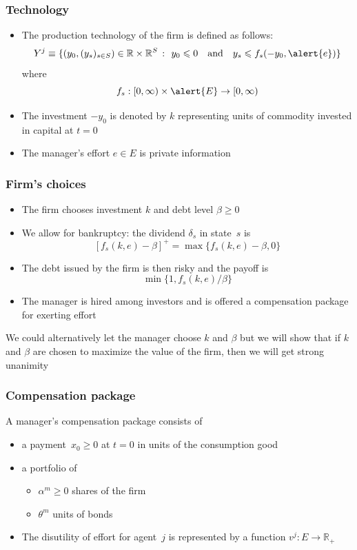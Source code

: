 \documentclass[blue]{beamer}
\def\R{\mathbb{R}}
\def\leq{\leqslant}
\def\geq{\geqslant}
\def\et{\quad \textrm{and} \quad}
\theoremstyle{definition}
\theoremstyle{example}
\begin{document}
\begin{frame}\frametitle{Technology}

\begin{itemize}
\item The production technology of the firm is defined as follows:
\[
Y^j \equiv \{(y_0,(y_s)_{s\in S}) \in \R \times \R^S \ \colon \ y_0 \leq 0 \et y_s\leq f_s(-y_0,\alert{e}) \}
\]
where
\[
f_s :[0,\infty) \times \alert{E} \to [0,\infty)
\]
\item The investment $-y_0$ is denoted by $k$ representing units of commodity invested in capital at $t=0$
\item The manager's effort $e\in E$ is private information
\end{itemize}

\end{frame}




\begin{frame}\frametitle{Firm's choices}

\begin{itemize}
\item The firm chooses investment $k$ and debt level $\beta \geq 0$
\item We allow for bankruptcy: the dividend $\delta_s$ in state~$s$ is
\[
[f_s(k,e) - \beta]^+ = \max\{f_s(k,e) -\beta,0\}
\]
\item The debt issued by the firm is then risky and the payoff is
\[
\min\{1,f_s(k,e)/\beta\}
\]
\item The manager is hired among investors and is offered a compensation package for exerting effort
\end{itemize}

We could alternatively let the manager choose $k$ and $\beta$ but we will show that if $k$ and $\beta$ are chosen to maximize the value of the firm, then we will get strong unanimity

\end{frame}


\begin{frame}\frametitle{Compensation package}

A manager's compensation package consists of
\begin{itemize}
\item a payment~$x_0\geq 0$ at $t=0$ in units of the consumption good
\item a portfolio of
    \begin{itemize}
    \item $\alpha^m \geq 0$ shares of the firm
    \item $\theta^m$ units of bonds
    \end{itemize}
\item The disutility of effort for agent~$j$ is represented by a function $v^j : E \to \R_+$
\end{itemize}

\end{frame}
\end{document}
